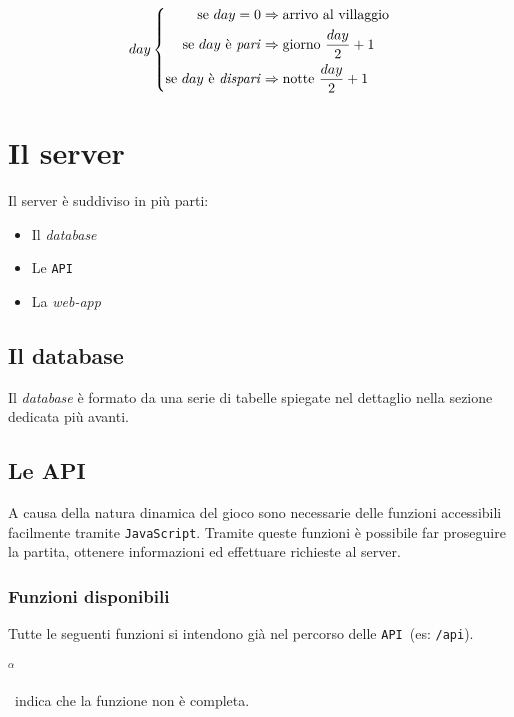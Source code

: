 \documentclass[10pt,a4paper]{article}
\newcommand{\pageurl}[1]{\small\texttt{#1}}
\newcommand{\valpha}{\begin{large}$^\alpha$\end{large}}
\newcommand{\lang}[1]{\texttt{#1}}
\newcommand{\API}{\texttt{API}}
\begin{document}
\[
	day
	\left\{
	\begin{aligned}
	\text{se}\ day = 0 						&\Rightarrow \text{arrivo al villaggio} \\
	\text{se}\ day\ \text{è \emph{pari}}		&\Rightarrow \text{giorno}\ \frac{day}{2}+1 \\
	\text{se}\ day\ \text{è \emph{dispari}}	&\Rightarrow \text{notte}\ \frac{day}{2}+1
	\end{aligned}
	\right.
\]

\section{Il server}
Il server è suddiviso in più parti:
\begin{itemize}
\item Il \emph{database}
\item Le \API
\item La \emph{web-app}
\end{itemize}

\subsection{Il database}
Il \emph{database} è formato da una serie di tabelle spiegate nel dettaglio nella sezione dedicata più avanti.

\subsection{Le API}
A causa della natura dinamica del gioco sono necessarie delle funzioni accessibili facilmente tramite \lang{JavaScript}. Tramite queste funzioni è possibile far proseguire la partita, ottenere informazioni ed effettuare richieste al server.

\subsubsection*{Funzioni disponibili}
Tutte le seguenti funzioni si intendono già nel percorso delle \API\ (es: \pageurl{/api}). 

\valpha~indica che la funzione non è completa.
\end{document}
